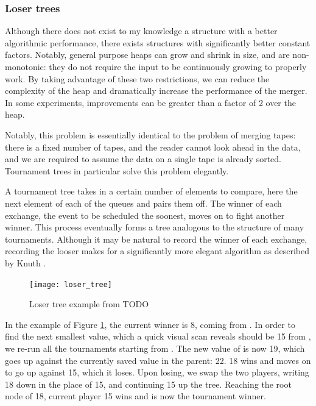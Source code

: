 \subsubsection{Loser trees}

Although there does not exist to my knowledge a structure with a better algorithmic performance, there exists structures with significantly better constant factors.
Notably, general purpose heaps can grow and shrink in size, and are non-monotonic: they do not require the input to be continuously growing to properly work.
By taking advantage of these two restrictions, we can reduce the complexity of the heap and dramatically increase the performance of the merger.
In some experiments, improvements can be greater than a factor of 2 over the heap.

Notably, this problem is essentially identical to the problem of merging tapes: there is a fixed number of tapes, and the reader cannot look ahead in the data, and we are required to assume the data on a single tape is already sorted.
Tournament trees in particular solve this problem elegantly.

A tournament tree takes in a certain number of elements to compare, here the next element of each of the queues and pairs them off.
The winner of each exchange, the event to be scheduled the soonest, moves on to fight another winner.
This process eventually forms a tree analogous to the structure of many tournaments.
Although it may be natural to record the winner of each exchange, recording the looser makes for a significantly more elegant algorithm as described by Knuth \cite{knuth_art_1998}.

\begin{figure}[h]
    \centering
    \texttt{[image: loser\_tree]}
    \caption{Loser tree example from TODO}
    \label{loser-tree:fig}
\end{figure}

In the example of Figure \ref{loser-tree:fig}, the current winner is 8, coming from .
In order to find the next smallest value, which a quick visual scan reveals should be 15 from , we re-run all the tournaments starting from .
The new value of  is now 19, which goes up against the currently saved value in the parent: 22.
18 wins and moves on to go up against 15, which it loses.
Upon losing, we swap the two players, writing 18 down in the place of 15, and continuing 15 up the tree.
Reaching the root node of 18, current player 15 wins and is now the tournament winner.


